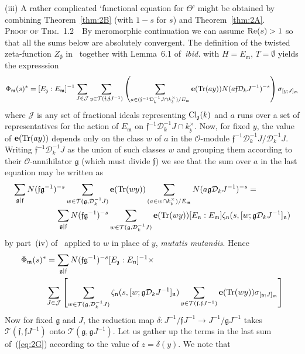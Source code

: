 \documentclass[12pt]{article}
\newcounter{rem}[section]%
\newcommand{\be}{\ensuremath{{\bf e}}}
\newcommand{\cD}{\ensuremath{\mathcal{D}}}
\newcommand{\cJ}{\ensuremath{\mathcal{J}}}
\newcommand{\Cl}{{\rm Cl}}
\newcommand{\cO}{\ensuremath{\mathcal{O}}}
\newcommand{\cT}{\ensuremath{\mathcal{T}}}
\newcommand{\ff}{\ensuremath{\mathfrak{f}}}
\newcommand{\fg}{\ensuremath{\mathfrak{g}}}
\newcommand{\fm}{\ensuremath{\mathfrak{m}}}
\newcommand{\fn}{\ensuremath{\mathfrak{n}}}
\newcommand{\fz}{\ensuremath{\mathfrak{z}}}
\newcommand{\inv}{^{-1}}%
\newcommand{\refeq}[1]{~(\ref{eq:#1})}
\newcommand{\rem}{\refstepcounter{rem}\noindent{\sc Remark \therem}}%
\renewcommand{\therem}{\thesection.\arabic{rem}}
\newcommand{\Tr}{{\rm Tr}}
\newcommand{\vertsp}{\vspace{1ex}}
\newcommand{\Phim}{\ensuremath{\Phi_{\fm}}}
\begin{document}
(iii) A rather complicated `functional equation for $\Theta$' might be obtained
by combining Theorem~\ref{thm:2B} (with $1-s$ for $s$) and Theorem~\ref{thm:2A}.
\vertsp\\
\noindent \textsc{Proof of Thm.\ 1.2\ }\
By meromorphic continuation we can assume ${\rm Re}(s)>1$
so that all the sums below are absolutely convergent. The definition of
the twisted zeta-function $Z_{\emptyset}$ in~\cite{twizas} together with
Lemma~6.1 of~\emph{ibid.} with $H=E_\fm$, $T=\emptyset$ yields the expresssion
\[
\Phim(s)^\ast=[E_\fz:E_\fm]\inv
\sum_{J\in\cJ}
\sum_{y\in\cT(\ff,\ff J\inv)}
\left(
\sum_{a\in(\ff\inv\cD_k\inv J\cap k_\fz^\times)/E_\fm}
\be(\Tr(ay))N(a\ff\cD_k J\inv)^{-s}
\right)
\sigma_{[y;J]_\fm}
\]
where $\cJ$ is any set of fractional ideals representing
$\Cl_\fz(k)$ and $a$ runs over a set of representatives for
the action of $E_\fm$ on $\ff\inv\cD_k\inv J\cap k_\fz^\times$. Now, for fixed
$y$, the value of $\be(\Tr(ay))$ depends only on the class $w$
of $a$ in the $\cO$-module $\ff\inv\cD_k\inv J/\cD_k\inv J$. Writing $\ff\inv\cD_k\inv J$ as
the union of such classes $w$ and grouping them according to
their $\cO$-annihilator $\fg$ (which must divide $\ff$) we see
that the sum over $a$ in the last equation may be written as
\begin{eqnarray*}
\lefteqn{\sum_{\fg|\ff}N(\ff{\fg}\inv)^{-s}\sum_{w\in \cT(\fg,\cD_k\inv J)}\be(\Tr(wy))
\sum_{(a\in w\cap k_\fz^\times)/E_\fm}N(a\fg\cD_k J\inv)^{-s}=}\hspace*{10ex}&&\\
&&\sum_{\fg|\ff}N(\ff{\fg}\inv)^{-s}\sum_{w\in \cT(\fg,\cD_k\inv J)}\be(\Tr(wy))
[E_{\fn}:E_\fm]\zeta_{\fn}(s,[w;\fg\cD_k J\inv]_{\fn})
\end{eqnarray*}
by part~(iv) of~\cite[Prop./Def.~6.1]{twizas}
applied to $w$ in place of $y$, \emph{mutatis mutandis}. Hence
\begin{eqnarray}
\lefteqn{\Phim(s)^\ast=
\sum_{\fg|\ff}N(\ff{\fg}\inv)^{-s}[E_\fz:E_{\fn}]\inv\times}\hspace*{5ex}&&\nonumber\\
&&\sum_{J\in\cJ}
\left[
\sum_{w\in\cT(\fg,\cD_k\inv J)}
\zeta_{\fn}(s,[w;\fg\cD_k J\inv]_{\fn})
\sum_{y\in\cT(\ff,\ff J\inv)}\be(\Tr(wy))\sigma_{[y;J]_\fm}
\right]\label{eq:2G}
\end{eqnarray}
Now for fixed $\fg$ and $J$,
the reduction map $\delta:J\inv/\ff J\inv\rightarrow J\inv/\fg J\inv$
takes $\cT(\ff,\ff J\inv)$ onto $\cT(\fg,\fg J\inv)$.
Let us gather up the terms in the last sum of\refeq{2G} according to the
value of $z=\delta(y)$. We note that
\end{document}
